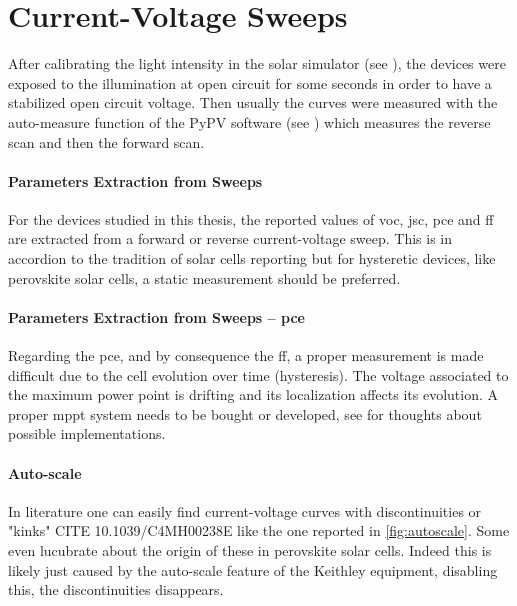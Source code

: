 \section{Current-Voltage Sweeps}

After calibrating the light intensity in the solar simulator (see ), the devices were exposed to the illumination at open circuit for some seconds in order to have a stabilized open circuit voltage. Then usually the curves were measured with the auto-measure function of the PyPV software (see ) which measures the reverse scan and then the forward scan.

\paragraph{Parameters Extraction from Sweeps}
For the devices studied in this thesis, the reported values of \gls{voc}, \gls{jsc}, \gls{pce} and \gls{ff} are extracted from a forward or reverse current-voltage sweep. This is in accordion to the tradition of solar cells reporting but for hysteretic devices, like perovskite solar cells, a static measurement should be preferred. %

\paragraph{Parameters Extraction from Sweeps -- \gls{pce}} Regarding the \gls{pce}, and by consequence the \gls{ff}, a proper measurement is made difficult due to the cell evolution over time (hysteresis). The voltage associated to the maximum power point is drifting and its localization affects its evolution. A proper \gls{mppt} system needs to be bought or developed, see  for thoughts about possible implementations.

\paragraph{Auto-scale}\label{autoscale} In literature one can easily find current-voltage curves with discontinuities or "kinks"\cite{Li2016,Snaith2014,Zhang2015} CITE  10.1039/C4MH00238E  like the one reported in \cref{fig:autoscale}. Some even lucubrate about the origin of these in perovskite solar cells. Indeed this is likely just caused by the auto-scale feature of the Keithley equipment, disabling this, the discontinuities disappears.

